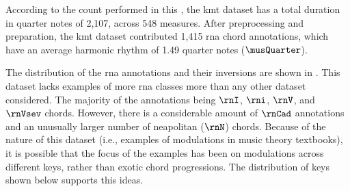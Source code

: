 
According to the count performed in this \thesisdiss{}, the
\gls{kmt} dataset has a total duration in quarter notes of
2,107, across 548 measures. After preprocessing and
preparation, the \gls{kmt} dataset contributed 1,415
\gls{rna} chord annotations, which have an average harmonic
rhythm of 1.49 quarter notes ($\musQuarter$).

The distribution of the \gls{rna} annotations and their
inversions are shown in . This
dataset lacks examples of more \gls{rna} classes more than
any other dataset considered. The majority of the
annotations being $\rnI$, $\rni$, $\rnV$, and $\rnVsev$
chords. However, there is a considerable amount of $\rnCad$
annotations and an unusually larger number of
\gls{neapolitan} ($\rnN$) chords. Because of the nature of
this dataset (i.e., examples of modulations in music theory
textbooks), it is possible that the focus of the examples
has been on modulations across different keys, rather than
exotic chord progressions. The distribution of keys shown
below supports this ideas.




